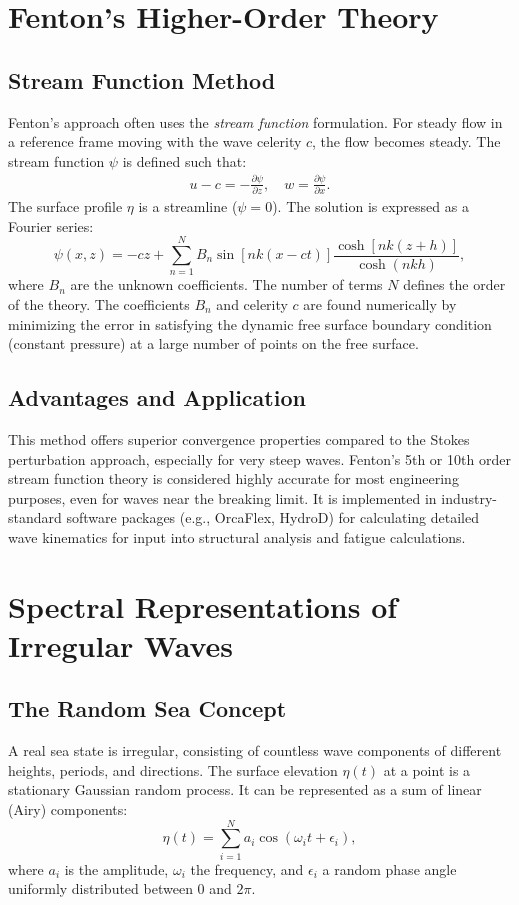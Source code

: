\documentclass[11pt,letterpaper]{article}
\begin{document}
\section{Fenton’s Higher-Order Theory}
\subsection{Stream Function Method}
Fenton's approach often uses the \emph{stream function} formulation. For steady flow in a reference frame moving with the wave celerity $c$, the flow becomes steady. The stream function $\psi$ is defined such that:
\begin{align}
u - c = -\frac{\partial \psi}{\partial z}, \quad w = \frac{\partial \psi}{\partial x}.
\end{align}
The surface profile $\eta$ is a streamline ($\psi = 0$). The solution is expressed as a Fourier series:
\begin{equation}
\psi(x,z) = -c z + \sum_{n=1}^{N} B_n \sin[nk(x - c t)] \frac{\cosh[nk(z+h)]}{\cosh(nkh)},
\end{equation}
where $B_n$ are the unknown coefficients. The number of terms $N$ defines the order of the theory. The coefficients $B_n$ and celerity $c$ are found numerically by minimizing the error in satisfying the dynamic free surface boundary condition (constant pressure) at a large number of points on the free surface.

\subsection{Advantages and Application}
This method offers superior convergence properties compared to the Stokes perturbation approach, especially for very steep waves. Fenton's 5th or 10th order stream function theory is considered highly accurate for most engineering purposes, even for waves near the breaking limit. It is implemented in industry-standard software packages (e.g., OrcaFlex, HydroD) for calculating detailed wave kinematics for input into structural analysis and fatigue calculations.

\section{Spectral Representations of Irregular Waves}
\subsection{The Random Sea Concept}
A real sea state is irregular, consisting of countless wave components of different heights, periods, and directions. The surface elevation $\eta(t)$ at a point is a stationary Gaussian random process. It can be represented as a sum of linear (Airy) components:
\begin{equation}
\eta(t) = \sum_{i=1}^{N} a_i \cos(\omega_i t + \epsilon_i),
\end{equation}
where $a_i$ is the amplitude, $\omega_i$ the frequency, and $\epsilon_i$ a random phase angle uniformly distributed between $0$ and $2\pi$.
\end{document}
